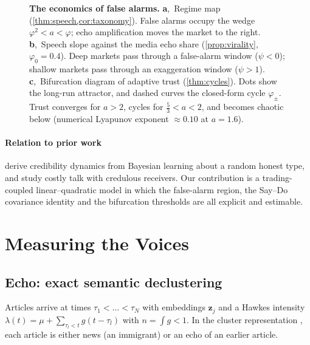 \documentclass[10pt,twocolumn,letterpaper]{article}
\theoremstyle{plain}
\theoremstyle{definition}
\theoremstyle{remark}
\newcommand{\z}{\bm{z}}
\begin{document}
\begin{figure}[t]
\begin{minipage}[t]{0.325\textwidth}
\end{minipage}
\caption{\textbf{The economics of false alarms.} \textbf{a},~Regime map (\cref{thm:speech,cor:taxonomy}). False alarms occupy the wedge $\varphi^2<a<\varphi$; echo amplification moves the market to the right. \textbf{b},~Speech slope against the media echo share (\cref{prop:virality}, $\varphi_0=0.4$). Deep markets pass through a false-alarm window ($\psi<0$); shallow markets pass through an exaggeration window ($\psi>1$). \textbf{c},~Bifurcation diagram of adaptive trust (\cref{thm:cycles}). Dots show the long-run attractor, and dashed curves the closed-form cycle $\varphi_\pm$. Trust converges for $a>2$, cycles for $\tfrac53<a<2$, and becomes chaotic below (numerical Lyapunov exponent $\approx0.10$ at $a=1.6$).}
\label{fig:strategic}
\end{figure}

\paragraph{Relation to prior work} \citet{benabou1992} derive credibility dynamics from Bayesian learning about a random honest type, and \citet{kartik2007} study costly talk with credulous receivers. Our contribution is a trading-coupled linear--quadratic model in which the false-alarm region, the Say--Do covariance identity and the bifurcation thresholds are all explicit and estimable.

\section{Measuring the Voices}\label{sec:measure}

\subsection{Echo: exact semantic declustering}\label{sec:echo}

Articles arrive at times $\tau_1<\dots<\tau_N$ with embeddings $\z_j$ and a Hawkes intensity $\lambda(t)=\mu+\sum_{\tau_l<t}g(t-\tau_l)$ with $n=\int g<1$. In the cluster representation \citep{hawkesoakes1974}, each article is either news (an immigrant) or an echo of an earlier article.
\end{document}
